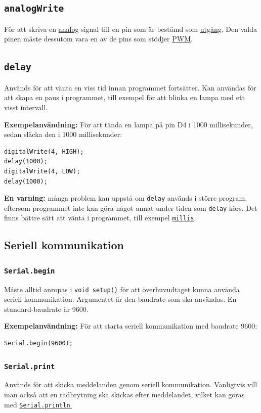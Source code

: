 \documentclass[11pt]{article}
\begin{document}
\subsection{\texttt{analogWrite}}
För att skriva en \hyperref[sec:analog-digital]{analog} signal till en pin som
är bestämd som \hyperref[sec:io]{utgång}. Den valda pinen måste dessutom vara
en
av de pins som stödjer \hyperref[sec:pwm]{PWM}.

\subsection{\texttt{delay}}
Används för att vänta en viss tid innan programmet fortsätter. Kan användas för
att skapa en paus i programmet, till exempel för att blinka en lampa med ett
visst intervall.

\textbf{Exempelanvändning:}
För att tända en lampa på pin D4 i 1000 millisekunder, sedan släcka den i 1000
millisekunder:

\begin{lstlisting}
digitalWrite(4, HIGH);
delay(1000);
digitalWrite(4, LOW);
delay(1000);
\end{lstlisting}

\textbf{En varning:} många problem kan uppstå om \texttt{delay} används i
större
program, eftersom programmet inte kan göra något annat under tiden som
\texttt{delay} körs. Det finns bättre sätt att vänta i programmet, till exempel
\hyperref[sec:millis]{\texttt{millis}}.

\subsection{Seriell kommunikation}
\subsubsection{\texttt{Serial.begin}}
Måste alltid anropas i \texttt{void setup()} för att överhuvudtaget kunna
använda seriell kommunikation. Argumentet är den baudrate som ska användas. En
standard-baudrate är 9600.

\textbf{Exempelanvändning:}
För att starta seriell kommunikation med baudrate 9600:
\begin{lstlisting}
Serial.begin(9600);
\end{lstlisting}

\subsubsection{\texttt{Serial.print}}\label{sec:serial.print}
Används för att skicka meddelanden genom seriell kommunikation. Vanligtvis vill
man också att en radbrytning ska skickas efter meddelandet, vilket kan göras
med \hyperref[sec:serial.println]{\texttt{Serial.println}.}
\end{document}
